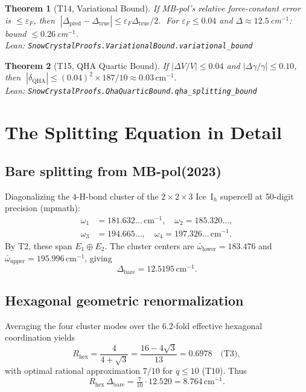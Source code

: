 \documentclass[11pt,a4paper]{article}
\newtheorem{theorem}{Theorem}
\begin{document}
\begin{theorem}[T14, Variational Bound]\label{thm:T14}
If MB-pol's relative force-constant error is $\le \varepsilon_F$, then
$\;|\Delta_\text{pred} - \Delta_\text{true}| \le \varepsilon_F \Delta_\text{true}/2.\;$
For $\varepsilon_F \le 0.04$ and $\Delta \approx 12.5$\,cm$^{-1}$: bound $\le 0.26$\,cm$^{-1}$.\\
{\small Lean: \texttt{SnowCrystalProofs.VariationalBound.variational\_bound}}
\end{theorem}

\begin{theorem}[T15, QHA Quartic Bound]\label{thm:T15}
If $|\Delta V/V| \le 0.04$ and $|\Delta\gamma/\gamma| \le 0.10$, then
$\;|\delta_\text{QHA}| \le (0.04)^2 \times 187 / 10 \approx 0.03\,\mathrm{cm}^{-1}.\;$\\
{\small Lean: \texttt{SnowCrystalProofs.QhaQuarticBound.qha\_splitting\_bound}}
\end{theorem}

\section{The Splitting Equation in Detail}
\label{sec:budget}

\subsection{Bare splitting from MB-pol(2023)}

Diagonalizing the $4$-H-bond cluster of the $2{\times}2{\times}3$ Ice~I$_h$ supercell at 50-digit precision (mpmath):
\begin{align}
\omega_1 &= 181.632\ldots\,\mathrm{cm}^{-1},\quad
\omega_2 = 185.320\ldots,\\
\omega_3 &= 194.665\ldots,\quad
\omega_4 = 197.326\ldots\,\mathrm{cm}^{-1}.
\end{align}
By T2, these span $E_1 \oplus E_2$. The cluster centers are $\bar\omega_\text{lower} = 183.476$ and $\bar\omega_\text{upper} = 195.996\,\mathrm{cm}^{-1}$, giving
\begin{equation}
\Delta_\text{bare} = 12.5195\,\mathrm{cm}^{-1}.
\end{equation}

\subsection{Hexagonal geometric renormalization}

Averaging the four cluster modes over the 6.2-fold effective hexagonal coordination yields
\[
R_\text{hex} = \frac{4}{4+\sqrt{3}} = \frac{16-4\sqrt{3}}{13} = 0.6978
\quad \text{(T3)},
\]
with optimal rational approximation $7/10$ for $q\le 10$ (T10). Thus
\[
R_\text{hex}\,\Delta_\text{bare} = \tfrac{7}{10} \cdot 12.520 = 8.764\,\mathrm{cm}^{-1}.
\]
\end{document}
